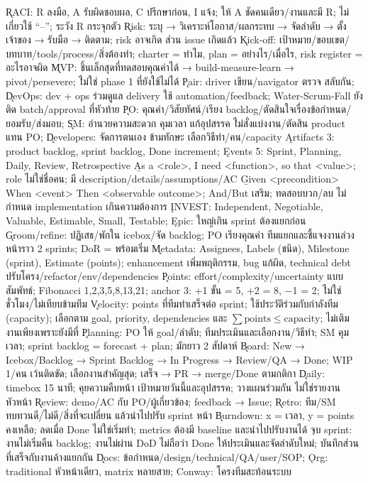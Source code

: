 \k{RACI}: R ลงมือ, A รับผิดชอบผล, C ปรึกษาก่อน, I แจ้ง; ให้ A ชัดคนเดียว/งานและมี R; ไม่เกี่ยวใช้ “–”; ระวัง R กระจุกตัว
\k{Risk}: ระบุ → วิเคราะห์โอกาส/ผลกระทบ → จัดลำดับ → ตั้งเจ้าของ → รับมือ → ติดตาม; \extra risk อาจเกิด ส่วน issue เกิดแล้ว
\k{Kick-off}: เป้าหมาย/ขอบเขต/บทบาท/tools/process/สิ่งต้องทำ; charter = ทำไม, plan = อย่างไร/เมื่อไร, risk register = อะไรอาจผิด
\k{MVP}: ชิ้นเล็กสุดที่ทดสอบคุณค่าได้ → build-measure-learn → pivot/persevere; \r{ไม่ใช่ phase 1 ที่ยังใช้ไม่ได้}
\k{Pair}: driver เขียน/navigator ตรวจ สลับกัน; \k{DevOps}: dev + ops ร่วมดูแล delivery ใช้ automation/feedback; Water-Scrum-Fall ยังติด batch/approval ที่หัวท้าย
\k{PO}: คุณค่า/วิสัยทัศน์/เรียง backlog/ตัดสินใจเรื่องข้อกำหนด/ยอมรับ/ส่งมอบ; \k{SM}: อำนวยความสะดวก คุมเวลา แก้อุปสรรค \r{ไม่สั่งแบ่งงาน/ตัดสิน product แทน PO}; \k{Developers}: จัดการตนเอง ข้ามทักษะ เลือกวิธีทำ/คน/capacity
\k{Artifacts 3}: product backlog, sprint backlog, Done increment; \k{Events 5}: Sprint, Planning, Daily, Review, Retrospective
\b{As a <role>, I need <function>, so that <value>}; role ไม่ใช่ชื่อคน; มี description/details/assumptions/AC
\b{Given <precondition> When <event> Then <observable outcome>}; And/But เสริม; ทดสอบบวก/ลบ ไม่กำหนด implementation เกินความต้องการ
\k{INVEST}: Independent, Negotiable, Valuable, Estimable, Small, Testable; \k{Epic}: ใหญ่เกิน sprint ต้องแยกก่อน
\k{Groom/refine}: ปฏิเสธ/พักใน icebox/จัด backlog; PO เรียงคุณค่า ทีมแยกและชี้แจงงานล่วงหน้าราว 2 sprints; DoR = พร้อมเริ่ม
\k{Metadata}: Assignees, Labels (ชนิด), Milestone (sprint), Estimate (points); enhancement เพิ่มพฤติกรรม, bug แก้ผิด, technical debt ปรับโครง/refactor/env/dependencies
\k{Points}: effort/complexity/uncertainty แบบสัมพัทธ์; Fibonacci 1,2,3,5,8,13,21; anchor 3: +1 ขั้น = 5, +2 = 8, −1 = 2; \r{ไม่ใช่ชั่วโมง/ไม่เทียบข้ามทีม}
\k{Velocity}: points ที่ทีมทำเสร็จต่อ sprint; ใช้ประวัติร่วมกับกำลังทีม (capacity); เลือกตาม \b{goal, priority, dependencies และ $\sum\text{points}\leq\text{capacity}$}; ไม่เติมงานเพียงเพราะยังมีที่
\k{Planning}: PO ให้ goal/ลำดับ; ทีมประเมินและเลือกงาน/วิธีทำ; SM คุมเวลา; sprint backlog = forecast + plan; มักยาว 2 สัปดาห์
\k{Board}: New → Icebox/Backlog → Sprint Backlog → In Progress → Review/QA → Done; WIP 1/คน เว้นติดขัด; เลือกงานสำคัญสุด; เสร็จ → PR → merge/Done ตามกติกา
\k{Daily}: timebox 15 นาที; คุยความคืบหน้า เป้าหมายวันนี้และอุปสรรค; วางแผนร่วมกัน ไม่ใช่รายงานหัวหน้า
\k{Review}: demo/AC กับ PO/ผู้เกี่ยวข้อง; feedback → Issue; \k{Retro}: ทีม/SM ทบทวนดี/ไม่ดี/สิ่งที่จะเปลี่ยน แล้วนำไปปรับ sprint หน้า
\k{Burndown}: x = เวลา, y = points คงเหลือ; ลดเมื่อ Done ไม่ใช่เริ่มทำ; metrics ต้องมี baseline และนำไปปรับงานได้
\k{จบ sprint}: งานไม่เริ่มคืน backlog; งานไม่ผ่าน DoD ไม่ถือว่า Done ให้ประเมินและจัดลำดับใหม่; บันทึกส่วนที่เสร็จกับงานค้างแยกกัน
\k{Docs}: ข้อกำหนด/design/technical/QA/user/SOP; \k{Org}: traditional หัวหน้าเดียว, matrix หลายสาย; Conway: โครงทีมสะท้อนระบบ


